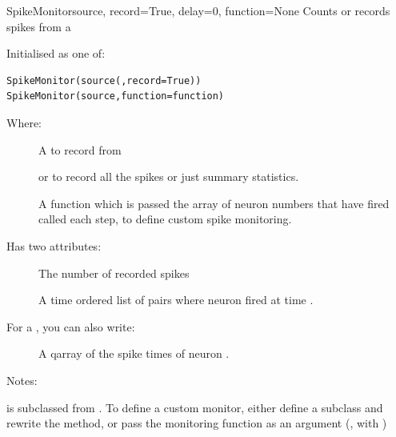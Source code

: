 \documentclass[letterpaper,10pt]{manual}
\begin{document}
\hypertarget{brian.SpikeMonitor}{}\begin{classdesc}{SpikeMonitor}{source, record=True, delay=0, function=None}
Counts or records spikes from a \hyperlink{brian.NeuronGroup}{}

Initialised as one of:

\begin{Verbatim}[commandchars=@\[\]]
SpikeMonitor(source(,record=True))
SpikeMonitor(source,function=function)
\end{Verbatim}

Where:
\begin{description}
\item[]
A \hyperlink{brian.NeuronGroup}{} to record from

\item[]
 or  to record all the spikes or just summary
statistics.

\item[]
A function  which is passed the array of neuron
numbers that have fired called each step, to define
custom spike monitoring.

\end{description}

Has two attributes:
\begin{description}
\item[]
The number of recorded spikes

\item[]
A time ordered list of pairs  where neuron  fired
at time .

\end{description}

For  a \hyperlink{brian.SpikeMonitor}{}, you can also write:
\begin{description}
\item[]
A qarray of the spike times of neuron .

\end{description}

Notes:

\hyperlink{brian.SpikeMonitor}{} is subclassed from \hyperlink{brian.Connection}{}.
To define a custom monitor, either define a subclass and
rewrite the  method, or pass the monitoring function
as an argument (, with )
\end{classdesc}
\end{document}
